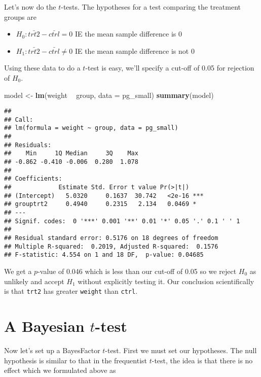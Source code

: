\documentclass[
]{book}
\newenvironment{Shaded}{\begin{snugshade}}{\end{snugshade}}
\newcommand{\DataTypeTok}[1]{\textcolor[rgb]{0.13,0.29,0.53}{#1}}
\newcommand{\KeywordTok}[1]{\textcolor[rgb]{0.13,0.29,0.53}{\textbf{#1}}}
\newcommand{\NormalTok}[1]{#1}
\newcommand{\OperatorTok}[1]{\textcolor[rgb]{0.81,0.36,0.00}{\textbf{#1}}}
\newcommand{\StringTok}[1]{\textcolor[rgb]{0.31,0.60,0.02}{#1}}
\providecommand{\tightlist}{%
  \setlength{\itemsep}{0pt}\setlength{\parskip}{0pt}}
\begin{document}
Let's now do the \(t\)-tests. The hypotheses for a test comparing the treatment groups are

\begin{itemize}
\tightlist
\item
  \(H_0 : \bar{trt2} - \bar{ctrl} = 0\) IE the mean sample difference is 0
\item
  \(H_1 : \bar{trt2} - \bar{ctrl} \neq 0\) IE the mean sample difference is not 0
\end{itemize}

Using these data to do a \(t\)-test is easy, we'll specify a cut-off of 0.05 for rejection of \(H_0\).

\begin{Shaded}
\begin{Highlighting}[]
\NormalTok{model <-}\StringTok{ }\KeywordTok{lm}\NormalTok{(weight }\OperatorTok{~}\StringTok{ }\NormalTok{group, }\DataTypeTok{data =}\NormalTok{ pg_small)}
\KeywordTok{summary}\NormalTok{(model)}
\end{Highlighting}
\end{Shaded}

\begin{verbatim}
## 
## Call:
## lm(formula = weight ~ group, data = pg_small)
## 
## Residuals:
##    Min     1Q Median     3Q    Max 
## -0.862 -0.410 -0.006  0.280  1.078 
## 
## Coefficients:
##             Estimate Std. Error t value Pr(>|t|)    
## (Intercept)   5.0320     0.1637  30.742   <2e-16 ***
## grouptrt2     0.4940     0.2315   2.134   0.0469 *  
## ---
## Signif. codes:  0 '***' 0.001 '**' 0.01 '*' 0.05 '.' 0.1 ' ' 1
## 
## Residual standard error: 0.5176 on 18 degrees of freedom
## Multiple R-squared:  0.2019, Adjusted R-squared:  0.1576 
## F-statistic: 4.554 on 1 and 18 DF,  p-value: 0.04685
\end{verbatim}

We get a \(p\)-value of 0.046 which is less than our cut-off of 0.05 so we reject \(H_0\) as unlikely and accept \(H_1\) without explicitly testing it. Our conclusion scientifically is that \texttt{trt2} has greater \texttt{weight} than \texttt{ctrl}.

\hypertarget{a-bayesian-t-test}{%
\section{\texorpdfstring{A Bayesian \(t\)-test}{A Bayesian t-test}}\label{a-bayesian-t-test}}

Now let's set up a BayesFactor \(t\)-test. First we must set our hypotheses. The null hypothesis is similar to that in the frequentist \(t\)-test, the idea is that there is no effect which we formulated above as
\end{document}
